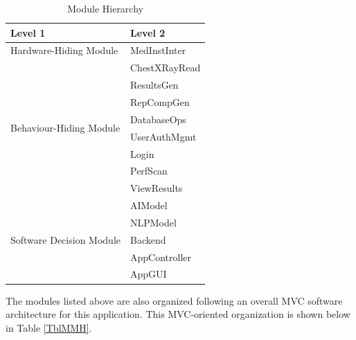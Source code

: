 \documentclass[12pt, titlepage]{article}
\begin{document}
\begin{table}[H]
  \centering
  \begin{tabular}{p{} p{}}
    \toprule
    \textbf{Level 1} & \textbf{Level 2} \\
    \midrule

    {Hardware-Hiding Module} & MedInstInter \\
    \midrule

    \multirow{8}{0.3\textwidth}{Behaviour-Hiding Module} & ChestXRayRead \\
    & ResultsGen \\
    & RepCompGen \\
    & DatabaseOps \\
    & UserAuthMgmt \\
    & Login \\ 
    & PerfScan \\
    & ViewResults \\
    \midrule

    \multirow{5}{0.3\textwidth}{Software Decision Module} & AIModel \\
    & NLPModel \\
    & Backend \\
    & AppController \\
    & AppGUI \\
    \bottomrule

  \end{tabular}
  \caption{Module Hierarchy}
  \label{TblMH}
\end{table}

The modules listed above are also organized following an overall MVC software
architecture for this application. This MVC-oriented organization is shown
below in Table \ref{TblMMH}.
\end{document}
